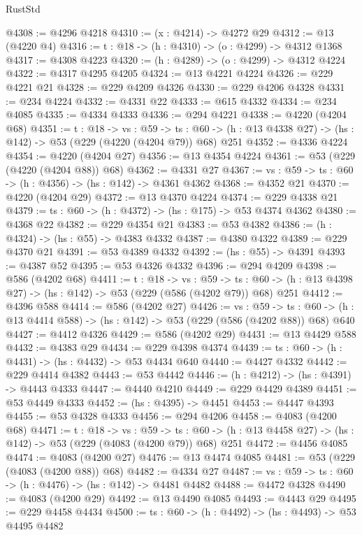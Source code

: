 \begin{lexlean}{RustStd}
\begin{coremodule}
@4308 := @4296 @4218
@4310 := (x : @4214) -> @4272 @29
@4312 := @13 (@4220 @4)
@4316 := {t : @18} -> (h : @4310) -> (o : @4299) -> @4312 @1368
@4317 := @4308 @4223
@4320 := (h : @4289) -> (o : @4299) -> @4312 @4224
@4322 := @4317 @4295 @4205
@4324 := @13 @4221 @4224
@4326 := @229 @4221 @21
@4328 := @229 @4209 @4326
@4330 := @229 @4206 @4328
@4331 := @234 @4224
@4332 := @4331 @22
@4333 := @615 @4332
@4334 := @234 @4085
@4335 := @4334 @4333
@4336 := @294 @4221
@4338 := @4220 (@4204 @68)
@4351 := {t : @18} ->
  {vs : @59} ->
  {ts : @60} -> (h : @13 @4338 @27) -> (hs : @142) -> @53 (@229 (@4220 (@4204 @79)) @68) @251
@4352 := @4336 @4224
@4354 := @4220 (@4204 @27)
@4356 := @13 @4354 @4224
@4361 := @53 (@229 (@4220 (@4204 @88)) @68)
@4362 := @4331 @27
@4367 := {vs : @59} -> {ts : @60} -> (h : @4356) -> (hs : @142) -> @4361 @4362
@4368 := @4352 @21
@4370 := @4220 (@4204 @29)
@4372 := @13 @4370 @4224
@4374 := @229 @4338 @21
@4379 := {ts : @60} -> (h : @4372) -> (hs : @175) -> @53 @4374 @4362
@4380 := @4368 @22
@4382 := @229 @4354 @21
@4383 := @53 @4382
@4386 := (h : @4324) -> (hs : @55) -> @4383 @4332
@4387 := @4380 @4322
@4389 := @229 @4370 @21
@4391 := @53 @4389 @4332
@4392 := (hs : @55) -> @4391
@4393 := @4387 @52
@4395 := @53 @4326 @4332
@4396 := @294 @4209
@4398 := @586 (@4202 @68)
@4411 := {t : @18} ->
  {vs : @59} ->
  {ts : @60} -> (h : @13 @4398 @27) -> (hs : @142) -> @53 (@229 (@586 (@4202 @79)) @68) @251
@4412 := @4396 @588
@4414 := @586 (@4202 @27)
@4426 := {vs : @59} ->
  {ts : @60} -> (h : @13 @4414 @588) -> (hs : @142) -> @53 (@229 (@586 (@4202 @88)) @68) @640
@4427 := @4412 @4326
@4429 := @586 (@4202 @29)
@4431 := @13 @4429 @588
@4432 := @4383 @29
@4434 := @229 @4398 @4374
@4439 := {ts : @60} -> (h : @4431) -> (hs : @4432) -> @53 @4434 @640
@4440 := @4427 @4332
@4442 := @229 @4414 @4382
@4443 := @53 @4442
@4446 := (h : @4212) -> (hs : @4391) -> @4443 @4333
@4447 := @4440 @4210
@4449 := @229 @4429 @4389
@4451 := @53 @4449 @4333
@4452 := (hs : @4395) -> @4451
@4453 := @4447 @4393
@4455 := @53 @4328 @4333
@4456 := @294 @4206
@4458 := @4083 (@4200 @68)
@4471 := {t : @18} ->
  {vs : @59} ->
  {ts : @60} -> (h : @13 @4458 @27) -> (hs : @142) -> @53 (@229 (@4083 (@4200 @79)) @68) @251
@4472 := @4456 @4085
@4474 := @4083 (@4200 @27)
@4476 := @13 @4474 @4085
@4481 := @53 (@229 (@4083 (@4200 @88)) @68)
@4482 := @4334 @27
@4487 := {vs : @59} -> {ts : @60} -> (h : @4476) -> (hs : @142) -> @4481 @4482
@4488 := @4472 @4328
@4490 := @4083 (@4200 @29)
@4492 := @13 @4490 @4085
@4493 := @4443 @29
@4495 := @229 @4458 @4434
@4500 := {ts : @60} -> (h : @4492) -> (hs : @4493) -> @53 @4495 @4482

\end{coremodule}
\end{lexlean}
